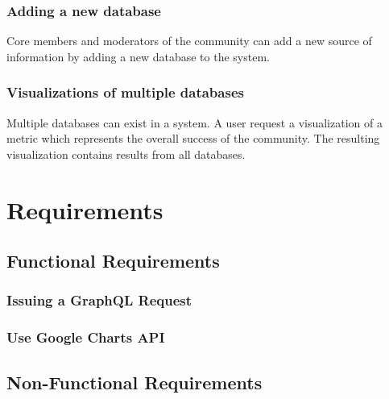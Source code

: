 \subsubsection{Adding a new database} Core members and moderators of the community can add a new source of information by adding a new database to the system.

\subsubsection{Visualizations of multiple databases} Multiple databases can exist in a system. A user request a visualization of a metric which represents the overall success of the community. The resulting visualization contains results from all databases.

\section{Requirements}

\subsection{Functional Requirements}

\subsubsection{Issuing a GraphQL Request}

\subsubsection{Use Google Charts API}

\subsubsection{}

\subsection{Non-Functional Requirements}